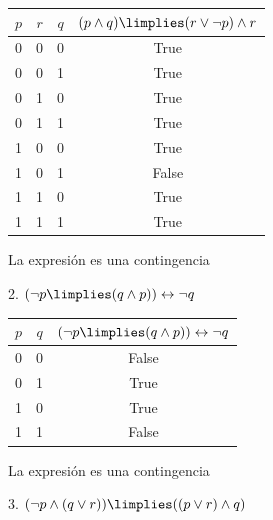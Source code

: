\documentclass{article}
\begin{document}
\begin{center}
    \begin{tabular}{| c | c | c | c |}
        \hline
        $p$ & $r$ & $q$ & $(p \land q) \limplies (r \lor \lnot p) \land r$ \\
        \hline
        0 & 0 & 0 & True\\
        0 & 0 & 1 & True\\
        0 & 1 & 0 & True\\
        0 & 1 & 1 & True\\
        1 & 0 & 0 & True\\
        1 & 0 & 1 & False\\
        1 & 1 & 0 & True\\
        1 & 1 & 1 & True\\
        \hline
    \end{tabular}

    \bigskip

    La expresión es una contingencia
\end{center}

\vspace{0.5cm}

2. $(\lnot p \limplies (q \land p)) \leftrightarrow \lnot q$

\begin{center}
    \begin{tabular}{| c | c | c |}
        \hline
        $p$ & $q$ & $(\lnot p \limplies (q \land p)) \leftrightarrow \lnot q$ \\
        \hline
        0 & 0 & False \\
        0 & 1 & True \\
        1 & 0 & True \\
        1 & 1 & False \\
        \hline
    \end{tabular}

    \bigskip

    La expresión es una contingencia
\end{center}


\newpage

3. $(\lnot p \land (q \lor r)) \limplies ((p \lor r) \land q)$
\end{document}
